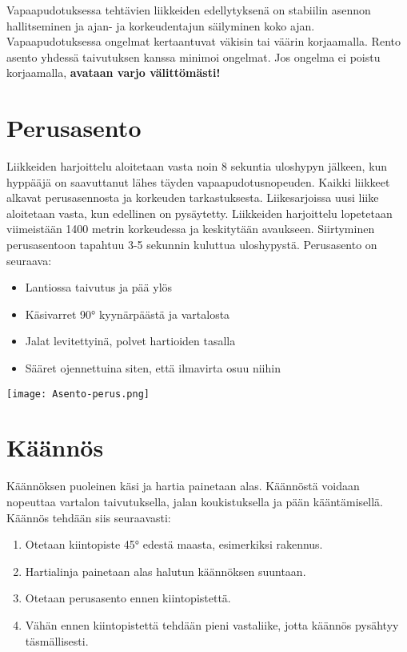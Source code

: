
Vapaapudotuksessa tehtävien liikkeiden edellytyksenä on stabiilin asennon hallitseminen ja ajan- ja korkeudentajun säilyminen koko ajan. Vapaapudotuksessa ongelmat kertaantuvat väkisin tai väärin korjaamalla. Rento asento yhdessä taivutuksen kanssa minimoi ongelmat. Jos ongelma ei poistu korjaamalla, \textbf{avataan varjo välittömästi!} 

\section{ Perusasento }
\label{perusliikkeet-vapaassa-perusasento}


Liikkeiden harjoittelu aloitetaan vasta noin 8 sekuntia uloshypyn jälkeen, kun hyppääjä on saavuttanut lähes täyden vapaapudotusnopeuden. Kaikki liikkeet alkavat perusasennosta ja korkeuden tarkastuksesta. Liikesarjoissa uusi liike aloitetaan vasta, kun edellinen on pysäytetty. Liikkeiden harjoittelu lopetetaan viimeistään 1400 metrin korkeudessa ja keskitytään avaukseen. Siirtyminen perusasentoon tapahtuu 3-5 sekunnin kuluttua uloshypystä. Perusasento on seuraava: 

\begin{itemize}
\item  Lantiossa taivutus ja pää ylös 
\item  Käsivarret 90° kyynärpäästä ja vartalosta 
\item  Jalat levitettyinä, polvet hartioiden tasalla 
\item  Sääret ojennettuina siten, että ilmavirta osuu niihin 
\end{itemize}

\begin{Figure}\centering\texttt{[image: Asento-perus.png]}\end{Figure} 

\section{ Käännös }
\label{perusliikkeet-vapaassa-kaannos}


Käännöksen puoleinen käsi ja hartia painetaan alas. Käännöstä voidaan nopeuttaa vartalon taivutuksella, jalan koukistuksella ja pään kääntämisellä. Käännös tehdään siis seuraavasti: 

\begin{enumerate}[label=\bfseries \arabic*)]
\item  Otetaan kiintopiste 45° edestä maasta, esimerkiksi rakennus. 
\item  Hartialinja painetaan alas halutun käännöksen suuntaan. 
\item  Otetaan perusasento ennen kiintopistettä. 
\item  Vähän ennen kiintopistettä tehdään pieni vastaliike, jotta käännös pysähtyy täsmällisesti. 
\end{enumerate}

